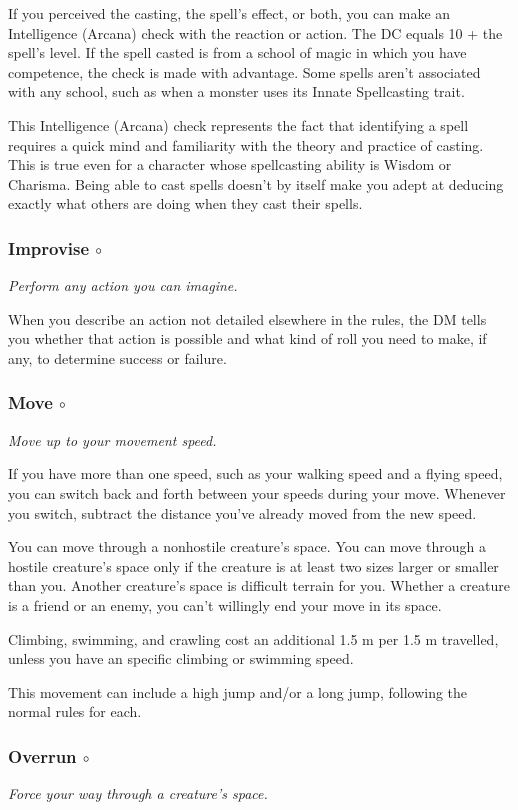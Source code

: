     If you perceived the casting, the spell's effect, or both, you can make an Intelligence (Arcana) check with the reaction or action.
    The DC equals 10 + the spell's level.
    If the spell casted is from a school of magic in which you have competence, the check is made with advantage.
    Some spells aren't associated with any school, such as when a monster uses its Innate Spellcasting trait.

    This Intelligence (Arcana) check represents the fact that identifying a spell requires a quick mind and familiarity with the theory and practice of casting.
    This is true even for a character whose spellcasting ability is Wisdom or Charisma.
    Being able to cast spells doesn't by itself make you adept at deducing exactly what others are doing when they cast their spells.
\subsubsection{Improvise $\circ$} \label{act::improvise}
    \textit{Perform any action you can imagine.}

    When you describe an action not detailed elsewhere in the rules, the DM tells you whether that action is possible and what kind of roll you need to make, if any, to determine success or failure.
\subsubsection{Move $\circ$} \label{act::move}
    \textit{Move up to your movement speed.}

    If you have more than one speed, such as your walking speed and a flying speed, you can switch back and forth between your speeds during your move.
    Whenever you switch, subtract the distance you've already moved from the new speed.

    You can move through a nonhostile creature's space.
    You can move through a hostile creature's space only if the creature is at least two sizes larger or smaller than you.
    Another creature's space is difficult terrain for you.
    Whether a creature is a friend or an enemy, you can't willingly end your move in its space.

    Climbing, swimming, and crawling cost an additional 1.5 m per 1.5 m travelled, unless you have an specific climbing or swimming speed.

    This movement can include a high jump and/or a long jump, following the normal rules for each.
\subsubsection{Overrun $\circ$} \label{act::overrun}
    \textit{Force your way through a creature's space.}

